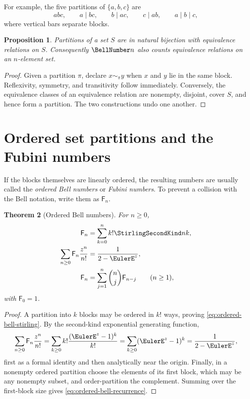 \documentclass[11pt,a4paper,oneside,openany]{book}
\newtheorem{theorem}{Theorem}[chapter]
\newtheorem{proposition}[theorem]{Proposition}
\theoremstyle{definition}
\theoremstyle{remark}
\begin{document}
For example, the five partitions of $\{a,b,c\}$ are
\[
 abc,\qquad a\mid bc,\qquad b\mid ac,\qquad c\mid ab,\qquad a\mid b\mid c,
\]
where vertical bars separate blocks.

\begin{proposition}
Partitions of a set $S$ are in natural bijection with equivalence relations on $S$.
Consequently $\BellNumber n$ also counts equivalence relations on an $n$-element set.
\end{proposition}
\begin{proof}
Given a partition $\pi$, declare $x\sim_\pi y$ when $x$ and $y$ lie in the same
block.  Reflexivity, symmetry, and transitivity follow immediately.  Conversely,
the equivalence classes of an equivalence relation are nonempty, disjoint, cover
$S$, and hence form a partition.  The two constructions undo one another.
\end{proof}


\section{Ordered set partitions and the Fubini numbers}
If the blocks themselves are linearly ordered, the resulting numbers are usually
called the \emph{ordered Bell numbers} or \emph{Fubini numbers}.  To prevent a
collision with the Bell notation, write them as $\mathsf F_n$.

\begin{theorem}[Ordered Bell numbers]
\label{thm:ordered-bell}
For $n\ge0$,
\begin{align}
 \mathsf F_n&=\sum_{k=0}^{n}k!\StirlingSecondKind nk,
 \label{eq:ordered-bell-stirling}\\
 \sum_{n\ge0}\mathsf F_n\frac{z^n}{n!}
 &=\frac{1}{2-\EulerE^z},
 \label{eq:ordered-bell-egf}\\
 \mathsf F_n&=\sum_{j=1}^{n}\binom nj\mathsf F_{n-j}
 \qquad(n\ge1),
 \label{eq:ordered-bell-recurrence}
\end{align}
with $\mathsf F_0=1$.
\end{theorem}
\begin{proof}
A partition into $k$ blocks may be ordered in $k!$ ways, proving
\eqref{eq:ordered-bell-stirling}.  By the second-kind exponential generating
function,
\[
 \sum_{n\ge0}\mathsf F_n\frac{z^n}{n!}
 =\sum_{k\ge0}k!\frac{(\EulerE^z-1)^k}{k!}
 =\sum_{k\ge0}(\EulerE^z-1)^k
 =\frac1{2-\EulerE^z},
\]
first as a formal identity and then analytically near the origin.  Finally, in a
nonempty ordered partition choose the elements of its first block, which may be any
nonempty subset, and order-partition the complement.  Summing over the first-block
size gives \eqref{eq:ordered-bell-recurrence}.
\end{proof}
\end{document}
